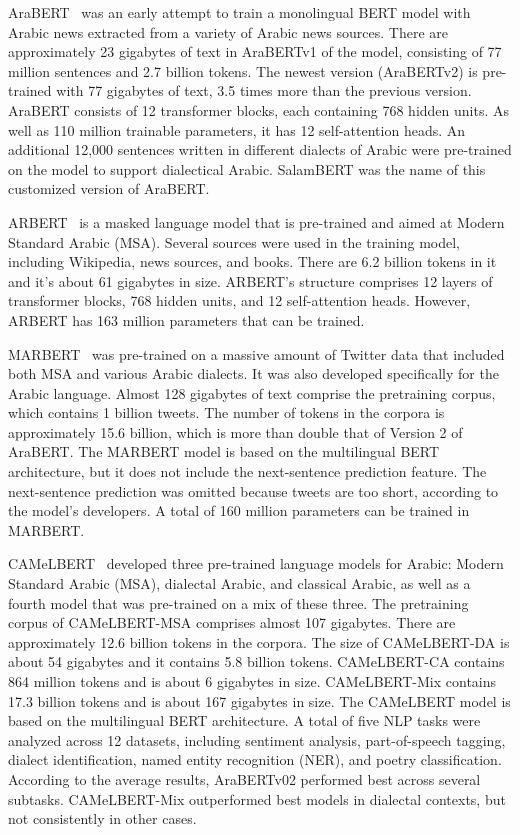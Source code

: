 AraBERT~\cite{antoun2020arabert} was an early attempt to train a monolingual BERT model with Arabic news extracted from a variety of Arabic news sources. There are approximately 23 gigabytes of text in AraBERTv1 of the model, consisting of 77 million sentences and 2.7 billion tokens.  The newest version (AraBERTv2) is pre-trained with 77 gigabytes of text, 3.5 times more than the previous version. AraBERT consists of 12 transformer blocks, each containing 768 hidden units. As well as 110 million trainable parameters, it has 12 self-attention heads. An additional 12,000 sentences written in different dialects of Arabic were pre-trained on the model to support dialectical Arabic. SalamBERT was the name of this customized version of AraBERT\cite{husain2021leveraging}.

ARBERT~\cite{abdul2020arbert} is a masked language model that is pre-trained and aimed at Modern Standard Arabic (MSA). Several sources were used in the training model, including Wikipedia, news sources, and books. There are 6.2 billion tokens in it and it's about 61 gigabytes in size. ARBERT's structure comprises 12 layers of transformer blocks, 768 hidden units, and 12 self-attention heads. However, ARBERT has 163 million parameters that can be trained.

MARBERT~\cite{abdul2020arbert} was pre-trained on a massive amount of Twitter data that included both MSA and various Arabic dialects. It was also developed specifically for the Arabic language. Almost 128 gigabytes of text comprise the pretraining corpus, which contains 1 billion tweets. The number of tokens in the corpora is approximately 15.6 billion, which is more than double that of Version 2 of AraBERT. The MARBERT model is based on the multilingual BERT architecture, but it does not include the next-sentence prediction feature. The next-sentence prediction was omitted because tweets are too short, according to the model's developers. A total of 160 million parameters can be trained in MARBERT.

CAMeLBERT~\cite{inoue2021interplay} developed three pre-trained language models for Arabic: Modern Standard Arabic (MSA), dialectal Arabic, and classical Arabic, as well as a fourth model that was pre-trained on a mix of these three. The pretraining corpus of CAMeLBERT-MSA comprises almost 107 gigabytes. There are approximately 12.6 billion tokens in the corpora. The size of CAMeLBERT-DA is about 54 gigabytes and it contains 5.8 billion tokens. CAMeLBERT-CA contains 864 million tokens and is about 6 gigabytes in size. CAMeLBERT-Mix contains 17.3 billion tokens and is about 167 gigabytes in size. The CAMeLBERT model is based on the multilingual BERT architecture. A total of five NLP tasks were analyzed across 12 datasets, including sentiment analysis, part-of-speech tagging, dialect identification, named entity recognition (NER), and poetry classification. According to the average results, AraBERTv02 performed best across several subtasks. CAMeLBERT-Mix outperformed best models in dialectal contexts, but not consistently in other cases.

